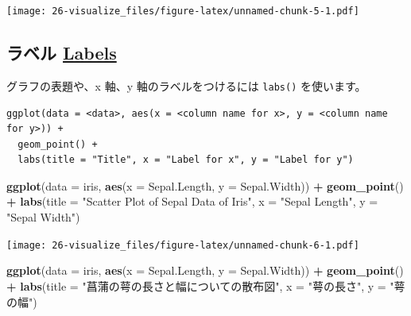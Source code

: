 \documentclass[
  xelatex, ja=standard]{bxjsbook}
\newenvironment{Shaded}{\begin{snugshade}}{\end{snugshade}}
\newcommand{\AttributeTok}[1]{\textcolor[rgb]{0.13,0.29,0.53}{#1}}
\newcommand{\FunctionTok}[1]{\textcolor[rgb]{0.13,0.29,0.53}{\textbf{#1}}}
\newcommand{\NormalTok}[1]{#1}
\newcommand{\SpecialCharTok}[1]{\textcolor[rgb]{0.81,0.36,0.00}{\textbf{#1}}}
\newcommand{\StringTok}[1]{\textcolor[rgb]{0.31,0.60,0.02}{#1}}
\theoremstyle{definition}
\theoremstyle{definition}
\theoremstyle{definition}
\theoremstyle{definition}
\theoremstyle{remark}
\begin{document}
\texttt{[image: 26-visualize\_files/figure-latex/unnamed-chunk-5-1.pdf]}

\hypertarget{ux30e9ux30d9ux30eb-labels}{%
\subsection{\texorpdfstring{ラベル \href{https://ggplot2.tidyverse.org/reference/labs.html}{Labels}}{ラベル Labels}}\label{ux30e9ux30d9ux30eb-labels}}

グラフの表題や、x 軸、y 軸のラベルをつけるには \texttt{labs()} を使います。

\begin{verbatim}
ggplot(data = <data>, aes(x = <column name for x>, y = <column name for y>)) +
  geom_point() +
  labs(title = "Title", x = "Label for x", y = "Label for y")
\end{verbatim}

\begin{Shaded}
\begin{Highlighting}[]
\FunctionTok{ggplot}\NormalTok{(}\AttributeTok{data =}\NormalTok{ iris, }\FunctionTok{aes}\NormalTok{(}\AttributeTok{x =}\NormalTok{ Sepal.Length, }\AttributeTok{y =}\NormalTok{ Sepal.Width)) }\SpecialCharTok{+}
  \FunctionTok{geom\_point}\NormalTok{() }\SpecialCharTok{+} 
  \FunctionTok{labs}\NormalTok{(}\AttributeTok{title =} \StringTok{"Scatter Plot of Sepal Data of Iris"}\NormalTok{, }\AttributeTok{x =} \StringTok{"Sepal Length"}\NormalTok{, }\AttributeTok{y =} \StringTok{"Sepal Width"}\NormalTok{)}
\end{Highlighting}
\end{Shaded}

\texttt{[image: 26-visualize\_files/figure-latex/unnamed-chunk-6-1.pdf]}

\begin{Shaded}
\begin{Highlighting}[]
\FunctionTok{ggplot}\NormalTok{(}\AttributeTok{data =}\NormalTok{ iris, }\FunctionTok{aes}\NormalTok{(}\AttributeTok{x =}\NormalTok{ Sepal.Length, }\AttributeTok{y =}\NormalTok{ Sepal.Width)) }\SpecialCharTok{+}
  \FunctionTok{geom\_point}\NormalTok{() }\SpecialCharTok{+} 
  \FunctionTok{labs}\NormalTok{(}\AttributeTok{title =} \StringTok{"菖蒲の萼の長さと幅についての散布図"}\NormalTok{, }\AttributeTok{x =} \StringTok{"萼の長さ"}\NormalTok{, }\AttributeTok{y =} \StringTok{"萼の幅"}\NormalTok{)}
\end{Highlighting}
\end{Shaded}
\end{document}
